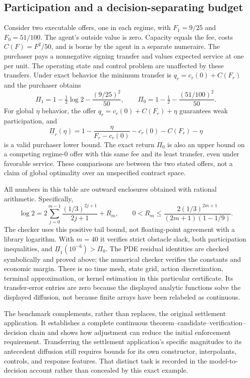 \subsection{Participation and a decision-separating budget}
Consider two executable offers, one in each regime, with $F_1=9/25$ and $F_0=51/100$. The agent's outside value is zero. Capacity equals the fee, costs $C(F)=F^2/50$, and is borne by the agent in a separate numeraire. The purchaser pays a nonnegative signing transfer and values expected service at one per unit. The operating state and control problem are unaffected by these transfers. Under exact behavior the minimum transfer is $q_r=c_r(0)+C(F_r)$ and the purchaser obtains
\begin{equation}
 \Pi_1=1-\tfrac12\log2-\frac{(9/25)^2}{50},\qquad
 \Pi_0=1-\tfrac12-\frac{(51/100)^2}{50}.
 \label{eq:r19-continuous-surplus}
\end{equation}
For global $\eta$ behavior, the offer $q_r=c_r(0)+C(F_r)+\eta$ guarantees weak participation, and
\begin{equation}
 \underline\Pi_r(\eta)
 =1-\frac{\eta}{F_r-c_r(0)}-c_r(0)-C(F_r)-\eta
 \label{eq:r19-continuous-budget}
\end{equation}
is a valid purchaser lower bound. The exact return $\Pi_0$ is also an upper bound on a competing regime-0 offer with this same fee and its least transfer, even under favorable service. These comparisons are between the two stated offers, not a claim of global optimality over an unspecified contract space.



All numbers in this table are outward enclosures obtained with rational arithmetic. Specifically,
\[
 \log2=2\sum_{j=0}^{m-1}\frac{(1/3)^{2j+1}}{2j+1}+R_m,
 \qquad
 0<R_m\leq\frac{2(1/3)^{2m+1}}{(2m+1)(1-1/9)}.
\]
The checker uses this positive tail bound, not floating-point agreement with a library logarithm. With $m=40$ it verifies strict obstacle slack, both participation inequalities, and $\underline\Pi_1(10^{-6})>\Pi_0$. The PDE residual identities are checked symbolically and proved above; the numerical checker verifies the constants and economic margin. There is no time mesh, state grid, action discretization, terminal approximation, or kernel estimation in this particular certificate. Its transfer-error entries are zero because the displayed analytic functions solve the displayed diffusion, not because finite arrays have been relabeled as continuous.

The benchmark complements, rather than replaces, the original settlement application. It establishes a complete continuous theorem--candidate--verification--decision chain and shows how adjustment can reduce the initial enforcement requirement. Transferring the settlement application's specific magnitudes to its antecedent diffusion still requires bounds for its own constructor, interpolants, controls, and response features. That distinct task is recorded in the model-to-decision account rather than concealed by this exact example.
